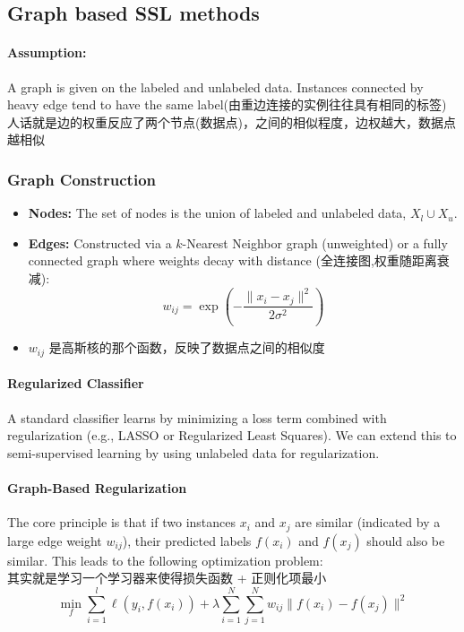 \documentclass[UTF8]{ctexart}
\begin{document}
\subsection{Graph based SSL methods}
\paragraph{Assumption: }A graph is given on the labeled and unlabeled data.  
Instances connected by heavy edge tend to have the same label(由重边连接的实例往往具有相同的标签)
\\
人话就是边的权重反应了两个节点(数据点)，之间的相似程度，边权越大，数据点越相似
\subsubsection{Graph Construction} 
\begin{itemize}
    \item \textbf{Nodes:} The set of nodes is the union of labeled and unlabeled data, $X_l \cup X_u$.
    \item \textbf{Edges:} Constructed via a $k$-Nearest Neighbor graph (unweighted) 
    or a fully connected graph where weights decay with distance (全连接图,权重随距离衰减):
    $$w_{ij} = \exp\left(-\frac{\|x_i - x_j\|^2}{2\sigma^2}\right)$$
    \item $w_{ij}$ 是高斯核的那个函数，反映了数据点之间的相似度
\end{itemize}

\paragraph{Regularized Classifier}
A standard classifier learns by minimizing a loss term combined with regularization (e.g., LASSO or Regularized Least Squares). We can extend this to semi-supervised learning by using unlabeled data for regularization.

\paragraph{Graph-Based Regularization}
The core principle is that if two instances $x_i$ and $x_j$ are similar (indicated by a large edge weight $w_{ij}$), 
their predicted labels $f(x_i)$ and $f(x_j)$ should also be similar. 
This leads to the following optimization problem: \\
其实就是学习一个学习器来使得损失函数 + 正则化项最小
$$\min_{f} \sum_{i=1}^{l} \ell(y_i, f(x_i)) + \lambda \sum_{i=1}^{N} \sum_{j=1}^{N} w_{ij} \|f(x_i) - f(x_j)\|^2$$
\end{document}

